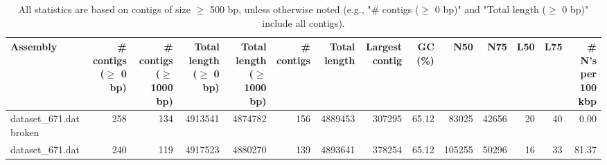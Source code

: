 \documentclass[12pt,a4paper]{article}
\begin{document}
\begin{table}[ht]
\begin{center}
\caption{All statistics are based on contigs of size $\geq$ 500 bp, unless otherwise noted (e.g., "\# contigs ($\geq$ 0 bp)" and "Total length ($\geq$ 0 bp)" include all contigs).}
\begin{tabular}{|l*{13}{|r}|}
\hline
Assembly & \# contigs ($\geq$ 0 bp) & \# contigs ($\geq$ 1000 bp) & Total length ($\geq$ 0 bp) & Total length ($\geq$ 1000 bp) & \# contigs & Total length & Largest contig & GC (\%) & N50 & N75 & L50 & L75 & \# N's per 100 kbp \\ \hline
dataset\_671.dat broken & 258 & 134 & 4913541 & 4874782 & 156 & 4889453 & 307295 & 65.12 & 83025 & 42656 & 20 & 40 & 0.00 \\ \hline
dataset\_671.dat & 240 & 119 & 4917523 & 4880270 & 139 & 4893641 & 378254 & 65.12 & 105255 & 50296 & 16 & 33 & 81.37 \\ \hline
\end{tabular}
\end{center}
\end{table}
\end{document}

